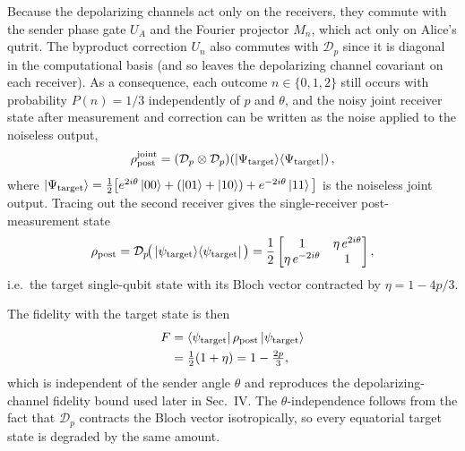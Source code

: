 Because the depolarizing channels act only on the receivers, they commute with the sender phase gate $U_A$ and the Fourier projector $M_n$, which act only on Alice's qutrit. The byproduct correction $U_n$ also commutes with $\mathcal{D}_p$ since it is diagonal in the computational basis (and so leaves the depolarizing channel covariant on each receiver). As a consequence, each outcome $n\in\{0,1,2\}$ still occurs with probability $P(n)=1/3$ independently of $p$ and $\theta$, and the noisy joint receiver state after measurement and correction can be written as the noise applied to the noiseless output,
\begin{align}
    \rho^{\text{joint}}_{\text{post}} = (\mathcal{D}_p \otimes \mathcal{D}_p)\!\left(\ket{\Psi_{\text{target}}}\!\bra{\Psi_{\text{target}}}\right),
\end{align}
where $\ket{\Psi_{\text{target}}} = \tfrac{1}{2}\big[e^{2i\theta}\ket{00} + (\ket{01}+\ket{10}) + e^{-2i\theta}\ket{11}\big]$ is the noiseless joint output. Tracing out the second receiver gives the single-receiver post-measurement state
\begin{align}
    \rho_{\text{post}} = \mathcal{D}_p\!\big(\ket{\psi_{\mathrm{target}}}\!\bra{\psi_{\mathrm{target}}}\big)
    = \frac{1}{2}\begin{bmatrix} 1 & \eta\, e^{2i\theta} \\ \eta\, e^{-2i\theta} & 1 \end{bmatrix},
\end{align}
i.e.\ the target single-qubit state with its Bloch vector contracted by $\eta=1-4p/3$.

The fidelity with the target state is then
\begin{align}
    F &= \bra{\psi_{\mathrm{target}}}\rho_{\text{post}}\ket{\psi_{\mathrm{target}}} \nonumber \\
    &= \tfrac{1}{2}(1 + \eta) = 1 - \tfrac{2p}{3},
\end{align}
which is independent of the sender angle $\theta$ and reproduces the depolarizing-channel fidelity bound used later in Sec.~IV. The $\theta$-independence follows from the fact that $\mathcal{D}_p$ contracts the Bloch vector isotropically, so every equatorial target state is degraded by the same amount.


